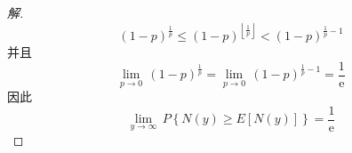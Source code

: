\documentclass[12pt]{article}
\begin{document}
\begin{enumerate}
\begin{proof}[解]
\begin{equation}
	{{\left( 1-p \right)}^{\frac{1}{p}}}\le {{\left( 1-p \right)}^{\left\lfloor \frac{1}{p} \right\rfloor }}<{{\left( 1-p \right)}^{\frac{1}{p}-1}}
	\end{equation}
	并且
	\begin{equation}
	\underset{p\to 0}{\mathop{\lim }}\,{{\left( 1-p \right)}^{\frac{1}{p}}}=\underset{p\to 0}{\mathop{\lim }}\,{{\left( 1-p \right)}^{\frac{1}{p}-1}}=\frac{1}{\text{e}}
	\end{equation}
	因此
	\begin{equation}
	\underset{y\to \infty }{\mathop{\lim }}\,P\left\{ N\left( y \right)\ge E\left[ N\left( y \right) \right] \right\} = \frac{1}{\text{e}}
	\end{equation}
\end{proof}

\end{enumerate}
\end{document}
